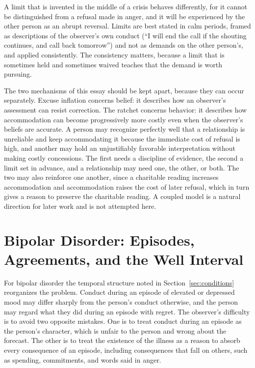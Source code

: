 \documentclass[11pt]{article}
\theoremstyle{definition}
\theoremstyle{remark}
\begin{document}
A limit that is invented in the middle of a crisis behaves differently, for it cannot be distinguished from a refusal made in anger, and it will be experienced by the other person as an abrupt reversal. Limits are best stated in calm periods, framed as descriptions of the observer's own conduct (``I will end the call if the shouting continues, and call back tomorrow'') and not as demands on the other person's, and applied consistently. The consistency matters, because a limit that is sometimes held and sometimes waived teaches that the demand is worth pursuing.

The two mechanisms of this essay should be kept apart, because they can occur separately. Excuse inflation concerns belief: it describes how an observer's assessment can resist correction. The ratchet concerns behavior: it describes how accommodation can become progressively more costly even when the observer's beliefs are accurate. A person may recognize perfectly well that a relationship is unreliable and keep accommodating it because the immediate cost of refusal is high, and another may hold an unjustifiably favorable interpretation without making costly concessions. The first needs a discipline of evidence, the second a limit set in advance, and a relationship may need one, the other, or both. The two may also reinforce one another, since a charitable reading increases accommodation and accommodation raises the cost of later refusal, which in turn gives a reason to preserve the charitable reading. A coupled model is a natural direction for later work and is not attempted here.

\section{Bipolar Disorder: Episodes, Agreements, and the Well Interval}\label{sec:bipolar}

For bipolar disorder the temporal structure noted in Section~\ref{sec:conditions} reorganizes the problem. Conduct during an episode of elevated or depressed mood may differ sharply from the person's conduct otherwise, and the person may regard what they did during an episode with regret. The observer's difficulty is to avoid two opposite mistakes. One is to treat conduct during an episode as the person's character, which is unfair to the person and wrong about the forecast. The other is to treat the existence of the illness as a reason to absorb every consequence of an episode, including consequences that fall on others, such as spending, commitments, and words said in anger.
\end{document}
